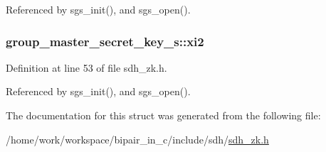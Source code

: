 Referenced by sgs\-\_\-init(), and sgs\-\_\-open().

\hypertarget{structgroup__master__secret__key__s_ab2d94234b3ba26944f321a5399adcf99}{
\subsubsection[{xi2}]{ group\-\_\-master\-\_\-secret\-\_\-key\-\_\-s\-::xi2}}\label{structgroup__master__secret__key__s_ab2d94234b3ba26944f321a5399adcf99}


Definition at line 53 of file sdh\-\_\-zk.\-h.



Referenced by sgs\-\_\-init(), and sgs\-\_\-open().



The documentation for this struct was generated from the following file\-:\begin{DoxyCompactItemize}
\item 
/home/work/workspace/bipair\-\_\-in\-\_\-c/include/sdh/\hyperlink{sdh__zk_8h}{sdh\-\_\-zk.\-h}\end{DoxyCompactItemize}
